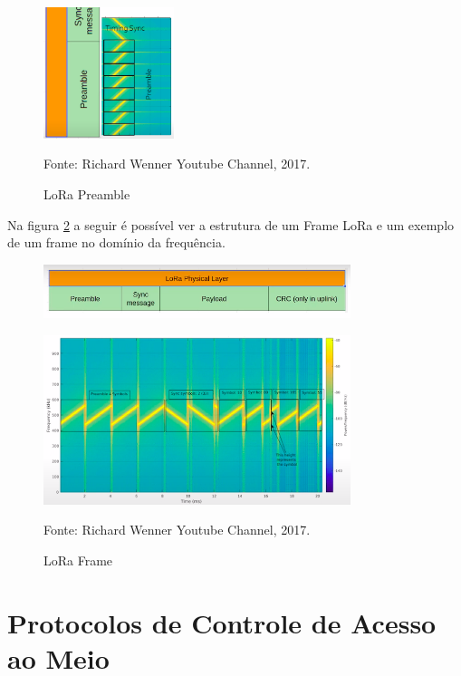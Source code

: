 \begin{figure}[H]
    \centering
	\caption{LoRa Preamble}
    \includegraphics[width=0.34\textwidth]{img/lora7.png}
    \label{fig:lora7}
    
    Fonte: Richard Wenner Youtube Channel, 2017.
\end{figure}

\newpage

Na figura \ref{fig:lora8-9} a seguir é possível ver a estrutura de um Frame LoRa e um exemplo
de um frame no domínio da frequência.

\begin{figure}[H]
    \centering
	\caption{LoRa Frame}
    \includegraphics[width=0.8\textwidth]{img/lora8.png}

    \includegraphics[width=0.8\textwidth]{img/lora9.png}
    \label{fig:lora8-9}
    
    Fonte: Richard Wenner Youtube Channel, 2017.
\end{figure}

\newpage

\section{Protocolos de Controle de Acesso ao Meio}

